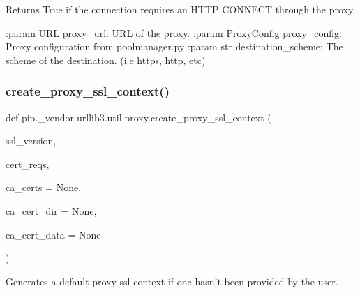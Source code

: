 \begin{DoxyVerb}Returns True if the connection requires an HTTP CONNECT through the proxy.

:param URL proxy_url:
    URL of the proxy.
:param ProxyConfig proxy_config:
    Proxy configuration from poolmanager.py
:param str destination_scheme:
    The scheme of the destination. (i.e https, http, etc)
\end{DoxyVerb}
 \mbox{\label{namespacepip_1_1__vendor_1_1urllib3_1_1util_1_1proxy_a4a6fd6c289ceaf8a0d6d39940fc569f8}} 
\subsubsection{\texorpdfstring{create\+\_\+proxy\+\_\+ssl\+\_\+context()}{create\_proxy\_ssl\_context()}}
{\footnotesize\ttfamily def pip.\+\_\+vendor.\+urllib3.\+util.\+proxy.\+create\+\_\+proxy\+\_\+ssl\+\_\+context (\begin{DoxyParamCaption}\item[{}]{ssl\+\_\+version,  }\item[{}]{cert\+\_\+reqs,  }\item[{}]{ca\+\_\+certs = {\ttfamily None},  }\item[{}]{ca\+\_\+cert\+\_\+dir = {\ttfamily None},  }\item[{}]{ca\+\_\+cert\+\_\+data = {\ttfamily None} }\end{DoxyParamCaption})}

\begin{DoxyVerb}Generates a default proxy ssl context if one hasn't been provided by the
user.
\end{DoxyVerb}
 